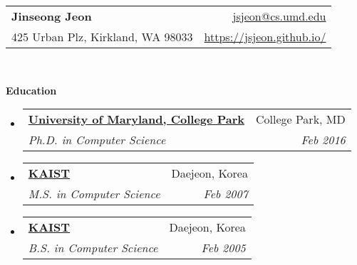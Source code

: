\documentclass[letterpaper,11pt]{article}
\makeatletter
\newcommand{\resheading}[1]{{\large \colorbox{mygrey}{\begin{minipage}{\textwidth}{\textbf{#1 \vphantom{p\^{E}}}}\end{minipage}}}}
\newcommand{\ressubheading}[4]{
\begin{tabular*}{6.5in}{l@{\extracolsep{\fill}}r}
    \textbf{#1} & #2 \\
    \textit{#3} & \textit{#4} \\
\end{tabular*}\vspace{-6pt}}
\makeatother
\begin{document}
\newcommand{\mywebheader}{
\begin{tabular*}{7in}{l@{\extracolsep{\fill}}r}
  \textbf{{\LARGE Jinseong Jeon}}
& \href{mailto:jsjeon@cs.umd.edu}{jsjeon@cs.umd.edu}
\\
  {\small 425 Urban Plz, Kirkland, WA 98033}
& \href{https://jsjeon.github.io/}{\url{https://jsjeon.github.io/}}
\\
\end{tabular*}
\\
\vspace{0.1in}}

\mywebheader

\resheading{Education}
  \begin{itemize}
    \item
      \ressubheading{\href{https://www.cs.umd.edu}{University of Maryland, College Park}}{College Park, MD}{{Ph.D. in Computer Science}}{Feb 2016}
    \item
      \ressubheading{\href{https://cs.kaist.ac.kr}{KAIST}}{Daejeon, Korea}{{M.S. in Computer Science}}{Feb 2007}
\begin{comment}
Outstanding Master's Thesis Award from Dept. of Computer Science, KAIST
\end{comment}
    \item
      \ressubheading{\href{https://cs.kaist.ac.kr}{KAIST}}{Daejeon, Korea}{{B.S. in Computer Science}}{Feb 2005}
\begin{comment}
Graduated with High Honor (\emph{Magna Cum Laude})
\end{comment}
  \end{itemize} %
\end{document}
